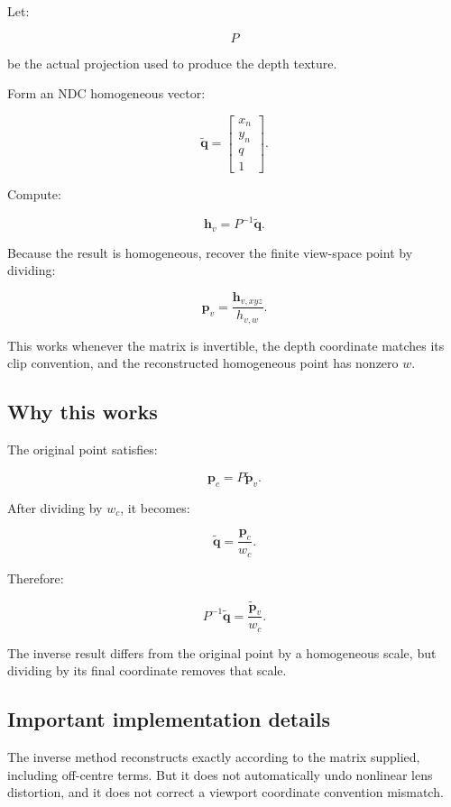 Let:

\[ P \]

be the actual projection used to produce the depth texture.

Form an NDC homogeneous vector:

\[ \tilde{\mathbf q}= \begin{bmatrix} x_n\\y_n\\q\\1 \end{bmatrix}. \]

Compute:

\[ \boxed{ \mathbf h_v=P^{-1}\tilde{\mathbf q}. } \]

Because the result is homogeneous, recover the finite view-space point by dividing:

\[ \boxed{ \mathbf p_v=\frac{\mathbf h_{v,xyz}}{h_{v,w}}. } \]

This works whenever the matrix is invertible, the depth coordinate matches its clip convention, and the reconstructed homogeneous point has nonzero \(w\).

\subsection{Why this works}\label{02-foundations-ii-ch035-why-this-works}

The original point satisfies:

\[ \mathbf p_c=P\tilde{\mathbf p}_v. \]

After dividing by \(w_c\), it becomes:

\[ \tilde{\mathbf q} = \frac{\mathbf p_c}{w_c}. \]

Therefore:

\[ P^{-1}\tilde{\mathbf q} = \frac{\tilde{\mathbf p}_v}{w_c}. \]

The inverse result differs from the original point by a homogeneous scale, but dividing by its final coordinate removes that scale.

\subsection{Important implementation details}\label{02-foundations-ii-ch035-important-implementation-details}

The inverse method reconstructs exactly according to the matrix supplied, including off-centre terms. But it does not automatically undo nonlinear lens distortion, and it does not correct a viewport coordinate convention mismatch.

